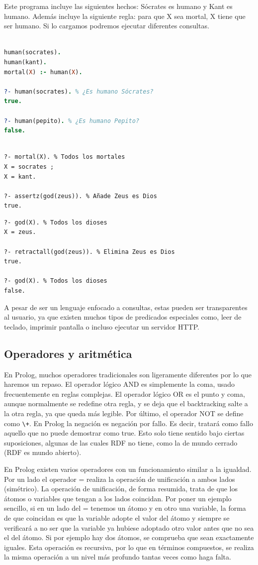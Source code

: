 \documentclass[openright,twoside,12pt]{book}
\begin{document}
Este programa incluye las siguientes hechos: Sócrates es humano y Kant es humano. Además incluye la siguiente regla: para que X sea mortal, X tiene que ser humano. Si lo cargamos podremos ejecutar diferentes consultas.

\begin{lstlisting}[language=Prolog]

human(socrates).
human(kant).
mortal(X) :- human(X).

?- human(socrates). % ¿Es humano Sócrates?
true.

?- human(pepito). % ¿Es humano Pepito?
false.
\end{lstlisting}
\begin{lstlisting}

?- mortal(X). % Todos los mortales
X = socrates ;
X = kant.

?- assertz(god(zeus)). % Añade Zeus es Dios
true.
\end{lstlisting}
\begin{lstlisting}
?- god(X). % Todos los dioses
X = zeus.

?- retractall(god(zeus)). % Elimina Zeus es Dios
true.

?- god(X). % Todos los dioses
false.
\end{lstlisting}


A pesar de ser un lenguaje enfocado a consultas, estas pueden ser transparentes al usuario, ya que existen muchos tipos de predicados especiales como, leer de teclado, imprimir pantalla o incluso ejecutar un servidor HTTP.

\subsection{Operadores y aritmética}

En Prolog, muchos operadores tradicionales son ligeramente diferentes por lo que haremos un repaso. El operador lógico AND es simplemente la coma, usado frecuentemente en reglas complejas. El operador lógico OR es el punto y coma, aunque normalmente se redefine otra regla, y se deja que el backtracking salte a la otra regla, ya que queda más legible. Por último, el operador NOT se define como \verb|\+|. En Prolog la negación es negación por fallo. Es decir, tratará como fallo aquello que no puede demostrar como true. Esto solo tiene sentido bajo ciertas suposiciones, algunas de las cuales RDF no tiene, como la de mundo cerrado (RDF es mundo abierto).

En Prolog existen varios operadores con un funcionamiento similar a la igualdad. Por un lado el operador = realiza la operación de unificación a ambos lados (simétrico). La operación de unificación, de forma resumida, trata de que los átomos o variables que tengan a los lados coincidan. Por poner un ejemplo sencillo, si en un lado del = tenemos un átomo y en otro una variable, la forma de que coincidan es que la variable adopte el valor del átomo y siempre se verificará a no ser que la variable ya hubiese adoptado otro valor antes que no sea el del átomo. Si por ejemplo hay dos átomos, se comprueba que sean exactamente iguales. Esta operación es recursiva, por lo que en términos compuestos, se realiza la misma operación a un nivel más profundo tantas veces como haga falta.
\end{document}
